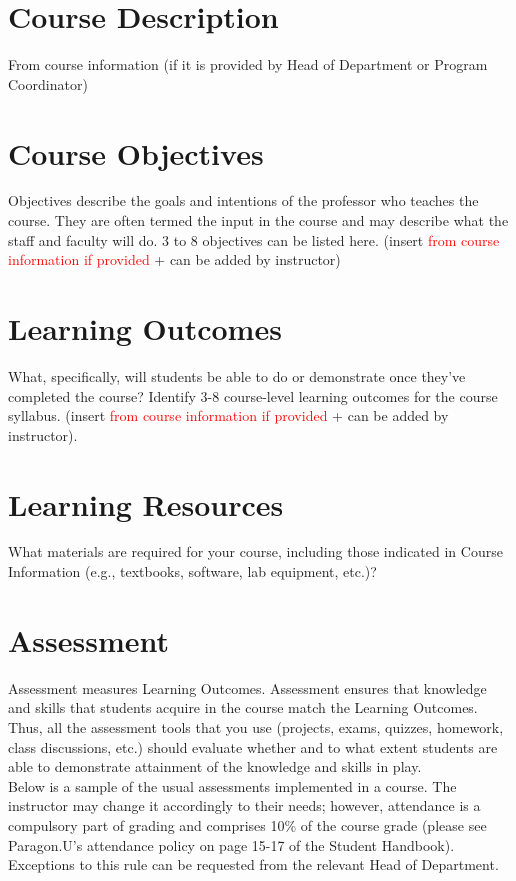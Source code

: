 \documentclass[12pt]{article}
\begin{document}
\section*{Course Description}
From course information (if it is provided by Head of Department or Program Coordinator)

\section*{Course Objectives}
Objectives describe the goals and intentions of the professor who teaches the course. They are often termed the input in the course and may describe what the staff and faculty will do. 3 to 8 objectives can be listed here. (insert \textcolor{red}{from course information if provided} + can be added by instructor)

\section*{Learning Outcomes}
What, specifically, will students be able to do or demonstrate once they've completed the course? Identify 3-8 course-level learning outcomes for the course syllabus. (insert \textcolor{red}{from course information if provided} + can be added by instructor).

\section*{Learning Resources}
What materials are required for your course, including those indicated in Course Information (e.g., textbooks, software, lab equipment, etc.)?

\section*{Assessment}
Assessment measures Learning Outcomes. Assessment ensures that knowledge and skills that students acquire in the course match the Learning Outcomes. Thus, all the assessment tools that you use (projects, exams, quizzes, homework, class discussions, etc.) should evaluate whether and to what extent students are able to demonstrate attainment of the knowledge and skills in play.
\\
Below is a sample of the usual assessments implemented in a course. The instructor may change it accordingly to their needs; however, attendance is a compulsory part of grading and comprises 10\% of the course grade (please see Paragon.U's attendance policy on page 15-17 of the Student Handbook). Exceptions to this rule can be requested from the relevant Head of Department.
\end{document}
